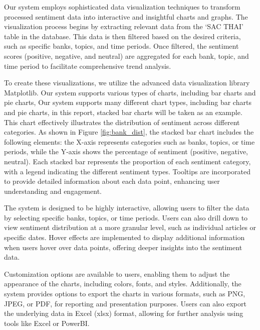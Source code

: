 {Our system employs sophisticated data visualization techniques to transform processed sentiment data into interactive and insightful charts and graphs. The visualization process begins by extracting relevant data from the `SAC THAI' table in the database. This data is then filtered based on the desired criteria, such as specific banks, topics, and time periods. Once filtered, the sentiment scores (positive, negative, and neutral) are aggregated for each bank, topic, and time period to facilitate comprehensive trend analysis. \par
To create these visualizations, we utilize the advanced data visualization library Matplotlib\cite{Hunter:2007}. Our system supports various types of charts, including bar charts and pie charts, Our system supports many different chart types, including bar charts and pie charts, in this report, stacked bar charts will be taken as an example. This chart effectively illustrates the distribution of sentiment across different categories. As shown in Figure \ref{fig:bank_dist}, the stacked bar chart includes the following elements: the X-axis represents categories such as banks, topics, or time periods, while the Y-axis shows the percentage of sentiment (positive, negative, neutral). Each stacked bar represents the proportion of each sentiment category, with a legend indicating the different sentiment types. Tooltips are incorporated to provide detailed information about each data point, enhancing user understanding and engagement. \par
The system is designed to be highly interactive, allowing users to filter the data by selecting specific banks, topics, or time periods. Users can also drill down to view sentiment distribution at a more granular level, such as individual articles or specific dates. Hover effects are implemented to display additional information when users hover over data points, offering deeper insights into the sentiment data. \par

Customization options are available to users, enabling them to adjust the appearance of the charts, including colors, fonts, and styles. Additionally, the system provides options to export the charts in various formats, such as PNG, JPEG, or PDF, for reporting and presentation purposes. Users can also export the underlying data in Excel (xlsx) format, allowing for further analysis using tools like Excel or PowerBI.\par

}
